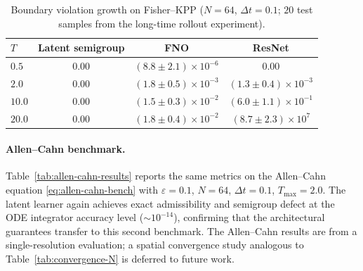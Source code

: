 \documentclass[11pt]{article}
\begin{document}
\begin{table}[htbp]
\centering
\caption{Boundary violation growth on Fisher--KPP ($N=64$, $\Delta t=0.1$; $20$ test samples from the long-time rollout experiment).}
\label{tab:boundary-growth}
\small
\begin{tabular}{@{}lccc@{}}
\hline
$T$ & Latent semigroup & FNO & ResNet \\
\hline
$0.5$ & $0.00$ & $(8.8\pm 2.1)\times10^{-6}$ & $0.00$ \\
$2.0$ & $0.00$ & $(1.8\pm 0.5)\times10^{-3}$ & $(1.3\pm 0.4)\times10^{-3}$ \\
$10.0$ & $0.00$ & $(1.5\pm 0.3)\times10^{-2}$ & $(6.0\pm 1.1)\times10^{-1}$ \\
$20.0$ & $0.00$ & $(1.8\pm 0.4)\times10^{-2}$ & $(8.7\pm 2.3)\times10^{7}$ \\
\hline
\end{tabular}
\end{table}

\paragraph{Allen--Cahn benchmark.}
Table~\ref{tab:allen-cahn-results} reports the same metrics on the Allen--Cahn equation \eqref{eq:allen-cahn-bench} with $\varepsilon=0.1$, $N=64$, $\Delta t=0.1$, $T_{\max}=2.0$. The latent learner again achieves exact admissibility and semigroup defect at the ODE integrator accuracy level ($\sim10^{-14}$), confirming that the architectural guarantees transfer to this second benchmark. The Allen--Cahn results are from a single-resolution evaluation; a spatial convergence study analogous to Table~\ref{tab:convergence-N} is deferred to future work.
\end{document}
